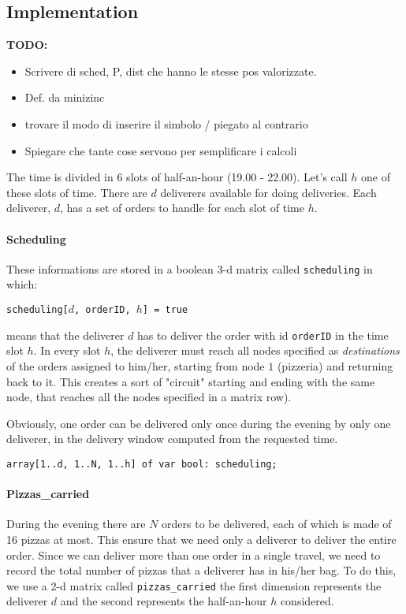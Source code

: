 \documentclass[10pt]{article}
\begin{document}
	\subsection{Implementation}


	\textbf{TODO:} 
	\begin{itemize}
		\item Scrivere di sched, P, dist che hanno le stesse pos valorizzate.
		\item Def. da minizinc
		\item trovare il modo di inserire il simbolo / piegato al contrario
		\item Spiegare che tante cose servono per semplificare i calcoli
	\end{itemize}
	
	The time is divided in 6 slots of half-an-hour (19.00 - 22.00). Let's call
	$h$ one of these slots of time.
	There are $d$ deliverers available for doing deliveries.
	Each deliverer, $d$, has a set of orders to handle for each slot of time $h$.

    \paragraph*{Scheduling}
	These informations are stored in a boolean 3-d matrix called 
	\texttt{scheduling} in which: 
	
	\begin{center}
		\texttt{scheduling[$d$, orderID, $h$] = true}
	\end{center}
	
	means that the deliverer $d$ has to deliver the order with id 
	\texttt{orderID} in the time slot $h$. In every slot $h$, the deliverer must 
	reach all nodes specified as \textit{destinations} of the orders assigned to 
	him/her, starting from node $1$ (pizzeria) and returning back to it. This creates
	 a sort of "circuit" starting and ending with the same node, that reaches all the 
	nodes specified in a matrix row).

	Obviously, one order can be delivered only once during the evening by only
	one deliverer, in the delivery window computed from the requested time.

	\begin{center}
		\texttt{array[1..d, 1..N, 1..h] of var bool: scheduling;}
	\end{center}

	\paragraph*{Pizzas\_carried}
	During the evening there are $N$ orders to be delivered, each of which is made of
	16 pizzas at most. This ensure that we need only a deliverer to deliver the 
	entire order.
	Since we can deliver more than one order in a single travel, we need to
	record the total number of pizzas that a deliverer has in his/her bag.
	To do this, we use a 2-d matrix called \texttt{pizzas\_carried}
	the first dimension represents the deliverer $d$ and the second 
	represents the half-an-hour $h$ considered.
\end{document}
